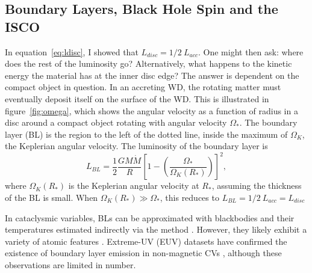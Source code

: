 \subsection{Boundary Layers, Black Hole Spin and the ISCO}

In equation~\ref{eq:ldisc}, I showed that $L_{disc} = 1/2~L_{acc}$. 
One might then ask: where does the rest of the luminosity go? Alternatively, 
what happens to the kinetic energy the material has at the inner disc edge?
The answer is dependent on the compact object in question. 
In an accreting WD, the rotating matter must eventually deposit itself 
on the surface of the WD. This is illustrated in figure~\ref{fig:omega},
which shows the angular velocity as a function of radius in a disc around
a compact object rotating with angular velocity $\Omega_*$. The boundary layer (BL)
is the region to the left of the dotted line, inside the maximum of $\Omega_K$, the Keplerian
angular velocity. The luminosity of the boundary layer is \citep{fkrbook}
\begin{equation}
L_{BL} = \frac{1}{2}\frac{GM \dot{M}}{R} \left[1 - \left(\frac{\Omega_*}{\Omega_K(R_*)}\right)\right]^2,
\end{equation}
where $\Omega_K(R_*)$ is the Keplerian angular velocity at $R_*$, assuming the thickness
of the BL is small. When $\Omega_K(R_*) \gg {\Omega_*}$, this reduces to 
$L_{BL} = 1/2~L_{acc} = L_{disc}$

In cataclysmic variables, 
BLs can be approximated with blackbodies and their temperatures estimated
indirectly via the \cite{zanstra1929} method \citep[e.g.][]{hoare1991,hoaredrew1993}.
However, they likely exhibit a variety of atomic features \citep{suleimanov2014}.
Extreme-UV (EUV) datasets have confirmed the existence of boundary layer emission
in non-magnetic CVs \citep{mauche1996}, although these observations
are limited in number.

